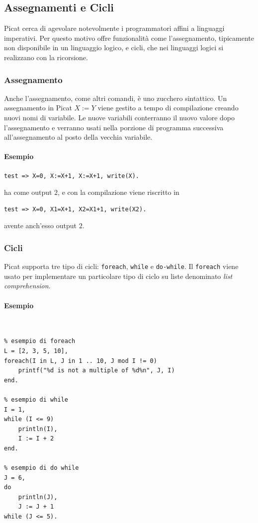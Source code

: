 \documentclass[12pt,a4paper,openright]{book} %
\begin{document}
\subsection{Assegnamenti e Cicli}
\label{subsec:picat_base_asscycle}

Picat cerca di agevolare notevolmente i programmatori affini a
linguaggi imperativi. Per questo motivo offre funzionalità come
l'assegnamento, tipicamente non disponibile in un linguaggio logico, e
cicli, che nei linguaggi logici si realizzano con la ricorsione.

\subsubsection{Assegnamento}

Anche l'assegnamento, come altri comandi, è uno zucchero
sintattico. Un assegnamento in Picat $X := Y$ viene gestito a tempo di
compilazione creando nuovi nomi di variabile. Le nuove variabili
conterranno il nuovo valore dopo l'assegnamento e verranno usati nella
porzione di programma successiva all'assegnamento al posto della
vecchia variabile.

\paragraph{Esempio}
\begin{verbatim}
test => X=0, X:=X+1, X:=X+1, write(X).
\end{verbatim}
ha come output $2$, e con la compilazione viene riscritto in
\begin{verbatim}
test => X=0, X1=X+1, X2=X1+1, write(X2).
\end{verbatim}
avente anch'esso output $2$.

\subsubsection{Cicli}

Picat supporta tre tipo di cicli: \verb|foreach|, \verb|while| e
\verb|do-while|. Il \verb|foreach| viene usato per implementare un
particolare tipo di ciclo su liste denominato \emph{list
  comprehension}.

\paragraph{Esempio}\
\begin{lstlisting}
% esempio di foreach
L = [2, 3, 5, 10],
foreach(I in L, J in 1 .. 10, J mod I != 0)
	printf("%d is not a multiple of %d%n", J, I)
end.

% esempio di while
I = 1,
while (I <= 9)
	println(I),
	I := I + 2
end.

% esempio di do while
J = 6,
do
	println(J),
	J := J + 1
while (J <= 5).
\end{lstlisting}
\end{document}
